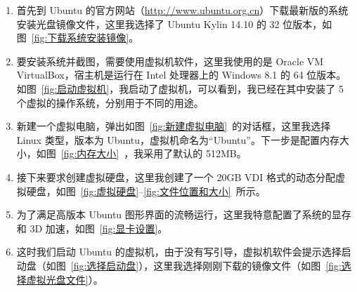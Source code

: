 \documentclass[cs4size,a4paper,nofonts]{ctexart}
\begin{document}
\begin{enumerate}

\item 首先到 Ubuntu 的官方网站（\url{http://www.ubuntu.org.cn}）下载最新版的系统安装光盘镜像文件，这里我选择了 Ubuntu Kylin 14.10 的 32 位版本，如图~\ref{fig:下载系统安装镜像}。

\item 要安装系统并截图，需要使用虚拟机软件，这里我使用的是 Oracle VM VirtualBox，宿主机是运行在 Intel 处理器上的 Windows 8.1 的 64 位版本。如图~\ref{fig:启动虚拟机}，我启动了虚拟机，可以看到，我已经在其中安装了 5 个虚拟的操作系统，分别用于不同的用途。

\begin{figure}[htp]
\end{figure}

\item 新建一个虚拟电脑，弹出如图~\ref{fig:新建虚拟电脑}~的对话框，这里我选择 Linux 类型，版本为 Ubuntu，虚拟机命名为“Ubuntu”。下一步是配置内存大小，如图~\ref{fig:内存大小}~，我采用了默认的 512MB。

\begin{figure}[htp]
\end{figure}

\item 接下来要求创建虚拟硬盘，这里我创建了一个 20GB VDI 格式的动态分配虚拟硬盘，如图~\ref{fig:虚拟硬盘}--\ref{fig:文件位置和大小}~所示。

\begin{figure}[htp]
\end{figure}

\begin{figure}[htp]
\end{figure}

\item 为了满足高版本 Ubuntu 图形界面的流畅运行，这里我特意配置了系统的显存和 3D 加速，如图~\ref{fig:显卡设置}。

\item 这时我们启动 Ubuntu 的虚拟机，由于没有写引导，虚拟机软件会提示选择启动盘（如图~\ref{fig:选择启动盘}），这里我选择刚刚下载的镜像文件（如图~\ref{fig:选择虚拟光盘文件}）。


\end{enumerate}
\end{document}
